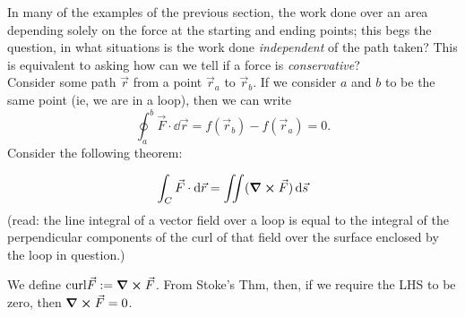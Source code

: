 \documentclass[12pt]{article}
\begin{document}
In many of the examples of the previous section, the work done over an area depending solely on the force at the starting and ending points; this begs the question, in what situations is the work done \textit{independent} of the path taken? This is equivalent to asking how can we tell if a force is \textit{conservative}?\\
Consider some path $\vec{r}$ from a point $\vec{r}_a$ to $\vec{r}_b$. If we consider $a$ and $b$ to be the same point (ie, we are in a loop), then we can write \[\oint_a^b \vec{F} \cdot \dd{\vec{r}} = f(\vec{r}_b) - f(\vec{r}_a) = 0.\] Consider the following theorem:
\begin{theorem}
  \[\int_C\vec{F}\cdot \dd{\vec{r}} = \iint (\curl \vec{F}) \dd{\vec{s}}\]
  (read: the line integral of a vector field over a loop is equal to the integral of the perpendicular components of the curl of that field over the surface enclosed by the loop in question.)
\end{theorem}

We define $\text{curl} \vec{F} :=\curl \vec{F}$. From Stoke's Thm, then, if we require the LHS to be zero, then $\curl \vec{F} = 0$.
\end{document}
